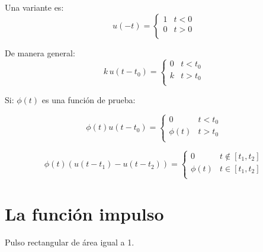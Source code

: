 Una variante es:
\begin{equation*}
    u(-t)=\begin{cases}
        1 & t<0\\
        0 & t>0\\
    \end{cases}
\end{equation*}
\begin{figure}[H]
    \centering
    
\end{figure}

De manera general:
\begin{equation}
    k\,u(t-t_0)=\begin{cases}
        0 & t<t_0\\
        k & t>t_0\\
    \end{cases}
\end{equation}
\begin{figure}[H]
    \centering
    
\end{figure}

Si: $\phi(t)$ es una función de prueba:
\begin{figure}[H]
    \centering
    
\end{figure}
\begin{equation}
    \phi(t)u(t-t_0)=\begin{cases}
        0       & t<t_0\\
        \phi(t) & t>t_0\\
    \end{cases}
\end{equation}
\begin{figure}[H]
    \centering
    
\end{figure}
\begin{equation*}
    \phi(t)(u(t-t_1)-u(t-t_2))=\begin{cases}
        0       & t\notin[t_1,t_2]\\
        \phi(t) & t\in[t_1,t_2]\\
    \end{cases}
\end{equation*}
\begin{figure}[H]
    \centering
    
\end{figure}

\section{La función impulso}
Pulso rectangular de área igual a 1.
\begin{figure}[H]
    \centering
    
\end{figure}

